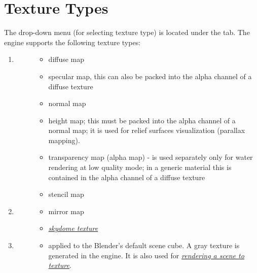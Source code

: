\documentclass[a4paper,12pt,oneside]{sphinxmanual}
\begin{document}
\section{Texture Types}
\label{textures:id2}\label{textures:index-1}
The  drop-down menu (for selecting texture type) is located under the  tab. The engine supports the following texture types:
\begin{enumerate}
\item {} \begin{description}
\item[{}] \leavevmode\begin{itemize}
\item {} 
diffuse map

\item {} 
specular map, this can also be packed into the alpha channel of a diffuse texture

\item {} 
normal map

\item {} 
height map; this must be packed into the alpha channel of a normal map; it is used for relief surfaces visualization (parallax mapping).

\item {} 
transparency map (alpha map) - is used separately only for water rendering at low quality mode; in a generic material this is contained in the alpha channel of a diffuse texture

\item {} 
stencil map

\end{itemize}

\end{description}

\item {} \begin{description}
\item[{}] \leavevmode\begin{itemize}
\item {} 
mirror map

\item {} 
{\hyperref[textures:skydome-texture]{\emph{skydome texture}}}

\end{itemize}

\end{description}

\item {} \begin{description}
\item[{}] \leavevmode\begin{itemize}
\item {} 
applied to the Blender's default scene cube. A gray texture is generated in the engine. It is also used for {\hyperref[textures:render-to-texture]{\emph{rendering a scene to texture}}}.


\end{itemize}
\end{description}
\end{enumerate}
\end{document}
